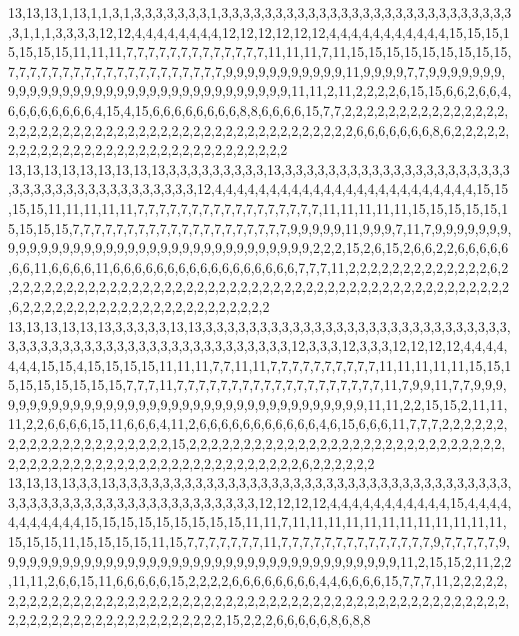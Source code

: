 13,13,13,1,13,1,1,3,1,3,3,3,3,3,3,3,1,3,3,3,3,3,3,3,3,3,3,3,3,3,3,3,3,3,3,3,3,3,3,3,3,3,3,3,3,1,1,1,3,3,3,3,12,12,4,4,4,4,4,4,4,4,12,12,12,12,12,12,4,4,4,4,4,4,4,4,4,4,4,15,15,15,15,15,15,15,11,11,11,7,7,7,7,7,7,7,7,7,7,7,7,7,11,11,11,7,11,15,15,15,15,15,15,15,15,15,7,7,7,7,7,7,7,7,7,7,7,7,7,7,7,7,7,7,7,7,9,9,9,9,9,9,9,9,9,9,9,11,9,9,9,9,7,7,9,9,9,9,9,9,9,9,9,9,9,9,9,9,9,9,9,9,9,9,9,9,9,9,9,9,9,9,9,9,9,9,9,11,11,2,11,2,2,2,2,6,15,15,6,6,2,6,6,4,6,6,6,6,6,6,6,6,4,15,4,15,6,6,6,6,6,6,6,6,8,8,6,6,6,6,15,7,7,2,2,2,2,2,2,2,2,2,2,2,2,2,2,2,2,2,2,2,2,2,2,2,2,2,2,2,2,2,2,2,2,2,2,2,2,2,2,2,2,2,2,2,2,2,2,2,6,6,6,6,6,6,6,8,6,2,2,2,2,2,2,2,2,2,2,2,2,2,2,2,2,2,2,2,2,2,2,2,2,2,2,2,2,2,2,2
13,13,13,13,13,13,13,13,13,3,3,3,3,3,3,3,3,3,13,3,3,3,3,3,3,3,3,3,3,3,3,3,3,3,3,3,3,3,3,3,3,3,3,3,3,3,3,3,3,3,3,3,3,3,3,3,3,12,4,4,4,4,4,4,4,4,4,4,4,4,4,4,4,4,4,4,4,4,4,4,4,4,15,15,15,15,11,11,11,11,11,7,7,7,7,7,7,7,7,7,7,7,7,7,7,7,7,7,11,11,11,11,11,15,15,15,15,15,15,15,15,15,7,7,7,7,7,7,7,7,7,7,7,7,7,7,7,7,7,7,7,7,9,9,9,9,9,11,9,9,9,7,11,7,9,9,9,9,9,9,9,9,9,9,9,9,9,9,9,9,9,9,9,9,9,9,9,9,9,9,9,9,9,9,9,9,9,9,9,2,2,2,15,2,6,15,2,6,6,2,2,6,6,6,6,6,6,6,11,6,6,6,6,11,6,6,6,6,6,6,6,6,6,6,6,6,6,6,6,6,6,7,7,7,11,2,2,2,2,2,2,2,2,2,2,2,2,2,6,2,2,2,2,2,2,2,2,2,2,2,2,2,2,2,2,2,2,2,2,2,2,2,2,2,2,2,2,2,2,2,2,2,2,2,2,2,2,2,2,2,2,2,2,2,2,2,6,2,2,2,2,2,2,2,2,2,2,2,2,2,2,2,2,2,2,2,2,2,2,2
13,13,13,13,13,13,3,3,3,3,3,13,13,3,3,3,3,3,3,3,3,3,3,3,3,3,3,3,3,3,3,3,3,3,3,3,3,3,3,3,3,3,3,3,3,3,3,3,3,3,3,3,3,3,3,3,3,3,3,3,3,3,3,3,3,3,3,12,3,3,3,12,3,3,3,12,12,12,12,4,4,4,4,4,4,4,15,15,4,15,15,15,15,11,11,11,7,7,11,11,7,7,7,7,7,7,7,7,7,7,11,11,11,11,11,15,15,15,15,15,15,15,15,15,7,7,7,11,7,7,7,7,7,7,7,7,7,7,7,7,7,7,7,7,7,7,7,11,7,9,9,11,7,7,9,9,9,9,9,9,9,9,9,9,9,9,9,9,9,9,9,9,9,9,9,9,9,9,9,9,9,9,9,9,9,9,9,9,9,9,11,11,2,2,15,15,2,11,11,11,2,2,6,6,6,6,15,11,6,6,6,4,11,2,6,6,6,6,6,6,6,6,6,6,6,4,6,15,6,6,6,11,7,7,7,2,2,2,2,2,2,2,2,2,2,2,2,2,2,2,2,2,2,2,2,2,15,2,2,2,2,2,2,2,2,2,2,2,2,2,2,2,2,2,2,2,2,2,2,2,2,2,2,2,2,2,2,2,2,2,2,2,2,2,2,2,2,2,2,2,2,2,2,2,2,2,2,2,2,2,2,2,2,6,2,2,2,2,2,2
13,13,13,13,3,3,13,3,3,3,3,3,3,3,3,3,3,3,3,3,3,3,3,3,3,3,3,3,3,3,3,3,3,3,3,3,3,3,3,3,3,3,3,3,3,3,3,3,3,3,3,3,3,3,3,3,3,3,3,3,3,3,3,3,3,3,12,12,12,12,4,4,4,4,4,4,4,4,4,4,4,15,4,4,4,4,4,4,4,4,4,4,4,15,15,15,15,15,15,15,15,15,11,11,7,11,11,11,11,11,11,11,11,11,11,11,11,15,15,15,11,15,15,15,15,11,15,7,7,7,7,7,7,7,11,7,7,7,7,7,7,7,7,7,7,7,7,7,7,9,7,7,7,7,7,9,9,9,9,9,9,9,9,9,9,9,9,9,9,9,9,9,9,9,9,9,9,9,9,9,9,9,9,9,9,9,9,9,9,9,9,9,11,2,15,15,2,11,2,2,11,11,2,6,6,15,11,6,6,6,6,6,15,2,2,2,2,6,6,6,6,6,6,6,6,4,4,6,6,6,6,15,7,7,7,11,2,2,2,2,2,2,2,2,2,2,2,2,2,2,2,2,2,2,2,2,2,2,2,2,2,2,2,2,2,2,2,2,2,2,2,2,2,2,2,2,2,2,2,2,2,2,2,2,2,2,2,2,2,2,2,2,2,2,2,2,2,2,2,2,2,2,2,2,2,2,2,15,2,2,2,6,6,6,6,6,8,6,8,8
